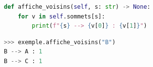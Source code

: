 \documentclass[svgnames,11pt]{beamer}
\begin{document}
\begin{frame}[fragile]
    \frametitle{}

\begin{center}
\begin{lstlisting}[language=Python , basicstyle=\ttfamily\small, xleftmargin=2em, xrightmargin=2em]
def affiche_voisins(self, s: str) -> None:
    for v in self.sommets[s]:
        print(f"{s} --> {v[0]} : {v[1]}")
\end{lstlisting}
\begin{lstlisting}[language=Python , basicstyle=\ttfamily\small, xleftmargin=2em, xrightmargin=2em]
>>> exemple.affiche_voisins("B")
B --> A : 1
B --> C : 1
\end{lstlisting}
\end{center}

\end{frame}
\end{document}

